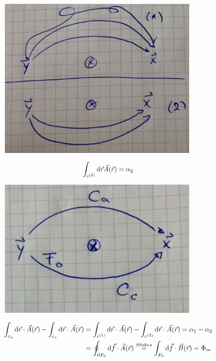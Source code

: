 \FloatBarrier
		\begin{figure} [h]
		\begin{center}
			\includegraphics[width=10cm]{Aharanov-Bohn-Effekt3}
		\end{center}
		\end{figure} 
\FloatBarrier
	\begin{align*}
		\int_{c^{(2)}} \mathrm{d} \vec{r} \vec{A}(\vec{r}) = \alpha_2
	\end{align*}
\FloatBarrier
		\begin{figure} [h]
		\begin{center}
			\includegraphics[width=10cm]{Aharanov-Bohn-Effekt4}
		\end{center}
		\end{figure}
\FloatBarrier
	\begin{align*}
		\int_{c_a} \mathrm{d} \vec{r} \cdot \vec{A}(\vec{r}) - \int_{c_c} \mathrm{d} \vec{r} \cdot \vec{A}(\vec{r}) &=
		\int_{c^{(1)}} \mathrm{d} \vec{r} \cdot \vec{A}(\vec{r}) - \int_{c^{(2)}} \mathrm{d} \vec{r} \cdot \vec{A}(\vec{r}) = \alpha_1 - \alpha_2 \\
		&= \oint_{\partial F_0} \mathrm{d} \vec{f} \cdot \vec{A}(\vec{r}) 
		\overset{Stokes}{=} \int_{F_0} \mathrm{d} \vec{f} \cdot \vec{B}(\vec{r}) = \Phi_m
	\end{align*}

